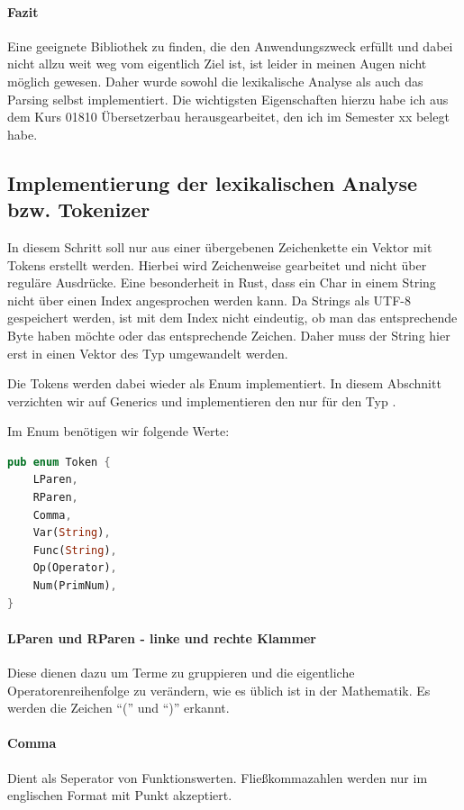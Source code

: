 \documentclass[11pt,a4paper, ngerman]{article}
\begin{document}
\paragraph{Fazit} Eine geeignete Bibliothek zu finden, die den Anwendungszweck erfüllt und dabei nicht allzu weit weg vom eigentlich Ziel ist, ist leider in meinen Augen nicht möglich gewesen. Daher wurde sowohl die lexikalische Analyse als auch das Parsing selbst implementiert. Die wichtigsten Eigenschaften hierzu habe ich aus dem Kurs 01810 Übersetzerbau herausgearbeitet, den ich im Semester xx belegt habe.

\subsection{Implementierung der lexikalischen Analyse bzw. Tokenizer} In diesem Schritt soll nur aus einer übergebenen Zeichenkette ein Vektor mit Tokens erstellt werden. Hierbei wird Zeichenweise gearbeitet und nicht über reguläre Ausdrücke. Eine besonderheit in Rust, dass ein Char in einem String nicht über einen Index angesprochen werden kann. Da Strings als UTF-8 gespeichert werden, ist mit dem Index nicht eindeutig, ob man das entsprechende Byte haben möchte oder das entsprechende Zeichen. Daher muss der String hier erst in einen Vektor des Typ  umgewandelt werden.

Die Tokens werden dabei wieder als Enum implementiert. In diesem Abschnitt verzichten wir auf Generics und implementieren den  nur für den Typ .

Im Enum benötigen wir folgende Werte:
\begin{lstlisting}[language=rust, caption={Enum Token}]
pub enum Token {
    LParen,
    RParen,
    Comma,
    Var(String),
    Func(String),
    Op(Operator),
    Num(PrimNum),
}
\end{lstlisting}

\paragraph{LParen und RParen - linke und rechte Klammer} Diese dienen dazu um Terme zu gruppieren und die eigentliche Operatorenreihenfolge zu verändern, wie es üblich ist in der Mathematik. Es werden die Zeichen ``('' und ``)'' erkannt.

\paragraph{Comma} Dient als Seperator von Funktionswerten. Fließkommazahlen werden nur im englischen Format mit Punkt akzeptiert.
\end{document}
